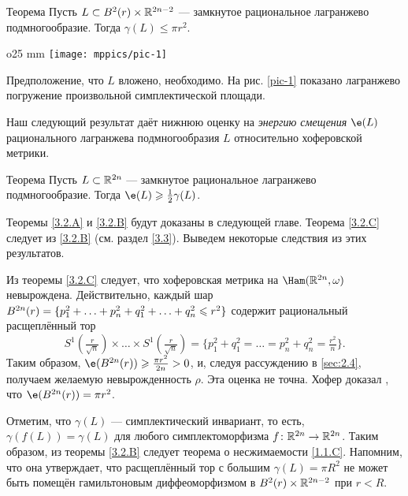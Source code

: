 \begin{thm}[(\cite{S1})]{Теорема}\label{3.2.B}
  Пусть $L \subset B^2 (r) \times \mathbb{R}^{2n - 2}$ — замкнутое
  рациональное лагранжево подмногообразие. 
  Тогда $\gamma (L) \le \pi r^2$.
\end{thm}

\begin{wrapfigure}[7]{o}{25 mm}
\vskip-3mm
\centering
\texttt{[image: mppics/pic-1]}
\caption{}\label{pic-1}
\vskip0mm
\end{wrapfigure}

Предположение, что $L$ вложено, необходимо.
На рис. \ref{pic-1} показано лагранжево погружение произвольной
симплектической площади.

Наш следующий результат даёт нижнюю оценку на \emph{энергию смещения} $\e (L)$ рационального лагранжева подмногообразия $L$ относительно хоферовской метрики.

\begin{thm}{Теорема}\label{3.2.C}
  Пусть $L \subset \mathbb{R}^{2n}$ — замкнутое рациональное лагранжево
  подмногообразие.
  Тогда $\e (L) \ge \tfrac12 \gamma (L)$.
\end{thm}

Теоремы \ref{3.2.A} и \ref{3.2.B} будут доказаны в следующей главе.
Теорема \ref{3.2.C} следует из \ref{3.2.B} (см. раздел \ref{3.3}).
Выведем некоторые следствия из этих результатов.

\begin{ex}{}\label{3.2.D}
Из теоремы \ref{3.2.C} следует, что хоферовская метрика на $\Ham (\RR^{2n}, \omega)$ невырождена.
Действительно, каждый шар 
$B^{2n}(r) = \{p_1^2 +\z\dots\z+ p_n^2 \z+ q_1^2+\z\dots\z+ q_n^2 \le r^2\}$
содержит рациональный расщеплённый тор 
\[
S^1(\tfrac r{\sqrt{n}}) \times\dots\times S^1(\tfrac r{\sqrt{n}})
=
\{p_1^{2}+q_1^2=\dots=p_n^{2}+q_n^2=\tfrac{r^2}{n}\}.
\]
Таким образом, $\e (B^{2n} (r)) \ge \tfrac{\pi r^2}{2n}> 0$, и, следуя рассуждению в \ref{sec:2.4}, получаем желаемую невырожденность $\rho$.
Эта оценка не точна.
Хофер доказал \cite{H1}, что $\e (B^{2n} (r)) = \pi r^2$.
\end{ex}

\begin{ex}{}\label{3.2.E}
Отметим, что $\gamma (L)$ — симплектический инвариант, то есть, $\gamma (f (L)) = \gamma (L)$ для любого симплектоморфизма $f\colon \mathbb{R}^{2n} \to \mathbb{R}^{2n}$.
Таким образом, из теоремы \ref{3.2.B} следует теорема о несжимаемости \ref{1.1.C}.
Напомним, что она утверждает, что расщеплённый тор с большим $\gamma (L) = \pi R^2$ не может быть помещён гамильтоновым диффеоморфизмом в $B^2 (r) \times \mathbb{R}^{2n - 2}$ при $r<R$.
\end{ex}

